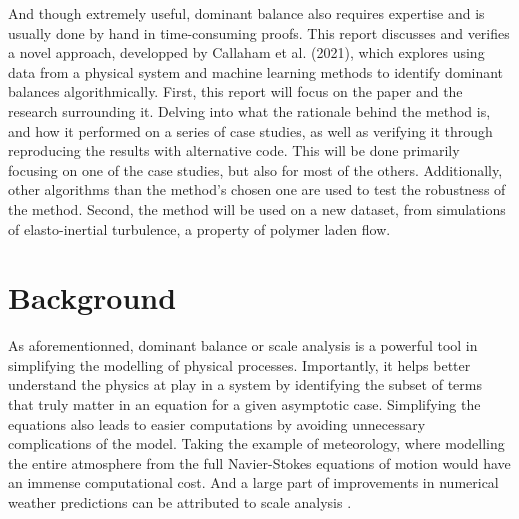 \documentclass[12pt]{report} %
\begin{document}
\vspace{5mm}

And though extremely useful, dominant balance also requires expertise and is usually done by hand in time-consuming proofs. This report discusses and verifies a novel approach, developped by Callaham et al. (2021)\cite{callaham2021learning}, which explores using data from a physical system and machine learning methods to identify dominant balances algorithmically. First, this report will focus on the paper and the research surrounding it. Delving into what the rationale behind the method is, and how it performed on a series of case studies, as well as verifying it through reproducing the results with alternative code. This will be done primarily focusing on one of the case studies, but also for most of the others. Additionally, other algorithms than the method's chosen one are used to test the robustness of the method. Second, the method will be used on a new dataset, from simulations of elasto-inertial turbulence, a property of polymer laden flow.


\chapter{Background}


As aforementionned, dominant balance or scale analysis is a powerful tool in simplifying the modelling of physical processes. Importantly, it helps better understand the physics at play in a system by identifying the subset of terms that truly matter in an equation for a given asymptotic case. Simplifying the equations also leads to easier computations by avoiding unnecessary complications of the model. Taking the example of meteorology, where modelling the entire atmosphere from the full Navier-Stokes equations of motion would have an immense computational cost. And a large part of improvements in numerical weather predictions can be attributed to scale analysis \cite{charney1947dynamics, phillips1963geostrophic, burger1958scale, yano2009scale}.

\vspace{5mm}
\end{document}
